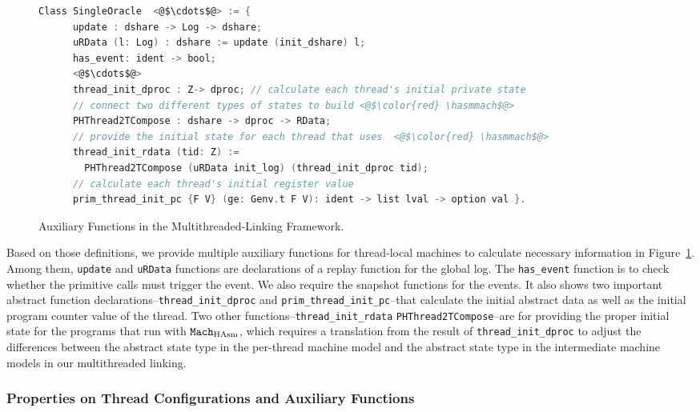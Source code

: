 \begin{figure}
\begin{lstlisting}[language=C, morekeywords={Class}]
  Class SingleOracle  <@$\cdots$@> := {
      update : dshare -> Log -> dshare;
      uRData (l: Log) : dshare := update (init_dshare) l;
      has_event: ident -> bool;      
      <@$\cdots$@>
      thread_init_dproc : Z-> dproc; // calculate each thread's initial private state
      // connect two different types of states to build <@$\color{red} \hasmmach$@>
      PHThread2TCompose : dshare -> dproc -> RData; 
      // provide the initial state for each thread that uses  <@$\color{red} \hasmmach$@>
      thread_init_rdata (tid: Z) :=
        PHThread2TCompose (uRData init_log) (thread_init_dproc tid);
      // calculate each thread's initial register value
      prim_thread_init_pc {F V} (ge: Genv.t F V): ident -> list lval -> option val }.
\end{lstlisting}
\caption{Auxiliary Functions in the Multithreaded-Linking Framework.}
\label{fig:chapter:conlink:multithreaded-linking-aux-functions}
\end{figure}

Based on those definitions, we provide multiple auxiliary functions 
for thread-local machines to calculate necessary information in Figure~\ref{fig:chapter:conlink:multithreaded-linking-aux-functions}.
Among them,  \lstinline$update$ and \lstinline$uRData$ functions are  declarations of a replay function for the global log. 
The \lstinline$has_event$ function is to check whether the primitive calls must trigger the event.
We also require the snapshot functions for the events.
It also shows two important abstract function declarations--\lstinline$thread_init_dproc$ and \lstinline$prim_thread_init_pc$--that calculate the initial abstract data as well as the initial program counter value of the thread. 
Two other functions--\lstinline$thread_init_rdata$ \lstinline$PHThread2TCompose$--are for providing the proper initial state for the programs that run with ${\mathrm{\texttt{Mach}}}_{\mathrm{HAsm}}$, 
which requires a translation from the result of \lstinline$thread_init_dproc$   to adjust the differences between
the abstract state type in the per-thread machine model and the abstract state type in the
intermediate machine models in our multithreaded linking. 

\subsubsection{Properties on Thread Configurations and Auxiliary Functions}


